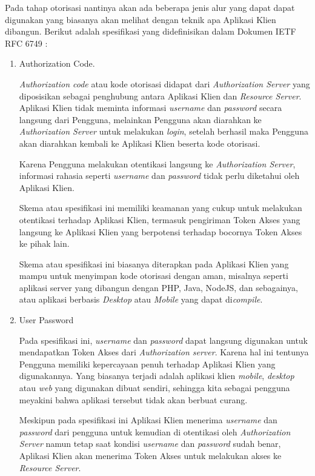 \documentclass[pdftex,12pt, oneside]{article}
\begin{document}
Pada tahap otorisasi nantinya akan ada beberapa jenis alur yang dapat dapat digunakan yang biasanya akan melihat dengan teknik apa Aplikasi Klien dibangun. Berikut adalah spesifikasi yang didefinisikan dalam Dokumen IETF RFC 6749 :

\begin{enumerate}

	\item Authorization Code.
	
	\textit{Authorization code} atau kode otorisasi didapat dari \textit{Authorization Server} yang diposisikan sebagai penghubung antara Aplikasi Klien dan \textit{Resource Server}. Aplikasi Klien tidak meminta informasi \textit{username} dan \textit{password} secara langsung dari Pengguna, melainkan Pengguna akan diarahkan ke \textit{Authorization Server} untuk melakukan \textit{login}, setelah berhasil maka Pengguna akan diarahkan kembali ke Aplikasi Klien beserta kode otorisasi.
	
	Karena Pengguna melakukan otentikasi langsung ke \textit{Authorization Server}, informasi rahasia seperti \textit{username} dan \textit{password} tidak perlu diketahui oleh Aplikasi Klien.
	
	Skema atau spesifikasi ini memiliki keamanan yang cukup untuk melakukan otentikasi terhadap Aplikasi Klien, termasuk pengiriman Token Akses yang langsung ke Aplikasi Klien yang berpotensi terhadap bocornya Token Akses ke pihak lain.
	
	Skema atau spesifikasi ini biasanya diterapkan pada Aplikasi Klien yang mampu untuk menyimpan kode otorisasi dengan aman, misalnya seperti aplikasi server yang dibangun dengan PHP, Java, NodeJS, dan sebagainya, atau aplikasi berbasis \textit{Desktop} atau \textit{Mobile} yang dapat di\textit{compile}.
	
	\item User Password
	
	Pada spesifikasi ini, \textit{username} dan \textit{password} dapat langsung digunakan untuk mendapatkan Token Akses dari \textit{Authorization server}. Karena hal ini tentunya Pengguna memiliki kepercayaan penuh terhadap Aplikasi Klien yang digunakannya. Yang biasanya terjadi adalah aplikasi klien \textit{mobile}, \textit{desktop} atau \textit{web} yang digunakan dibuat sendiri, sehingga kita sebagai pengguna meyakini bahwa aplikasi tersebut tidak akan berbuat curang.
	
	Meskipun pada spesifikasi ini Aplikasi Klien menerima \textit{username} dan \textit{password} dari pengguna untuk kemudian di otentikasi oleh \textit{Authorization Server} namun tetap saat kondisi \textit{username} dan \textit{password} sudah benar, Aplikasi Klien akan menerima Token Akses untuk melakukan akses ke \textit{Resource Server}.
	

\end{enumerate}
\end{document}

